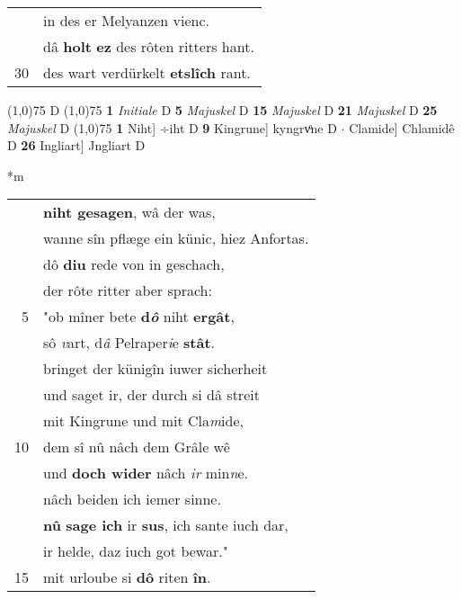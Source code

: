 \documentclass[8pt,a4paper,notitlepage]{article}
\begin{document}
\begin{table}[ht]
\begin{minipage}[t]{0.5\linewidth}
\begin{tabular}{rl}
 & in des er Melyanzen vienc.\\ 
 & dâ \textbf{holt} \textbf{ez} des rôten ritters hant.\\ 
30 & des wart verdürkelt \textbf{etslîch} rant.\\ 
\end{tabular}
\scriptsize
\line(1,0){75} \newline
D \newline
\line(1,0){75} \newline
\textbf{1} \textit{Initiale} D  \textbf{5} \textit{Majuskel} D  \textbf{15} \textit{Majuskel} D  \textbf{21} \textit{Majuskel} D  \textbf{25} \textit{Majuskel} D  \newline
\line(1,0){75} \newline
\textbf{1} Niht] ÷iht D \textbf{9} Kingrune] kyngrvͦne D  $\cdot$ Clamide] Chlamidê D \textbf{26} Ingliart] Jngliart D \newline
\end{minipage}
\hspace{0.5cm}
\begin{minipage}[t]{0.5\linewidth}
\small
\begin{center}*m
\end{center}
\begin{tabular}{rl}
 & \textbf{niht gesagen}, wâ der was,\\ 
 & wanne sîn pflæge ein künic, hiez Anfortas.\\ 
 & dô \textbf{diu} rede von in geschach,\\ 
 & der rôte ritter aber sprach:\\ 
5 & "ob mîner bete \textbf{d\textit{ô}} niht \textbf{ergât},\\ 
 & sô \textit{v}art, d\textit{â} Pelraper\textit{i}e \textbf{stât}.\\ 
 & bringet der künigîn iuwer sicherheit\\ 
 & und saget ir, der durch si dâ streit\\ 
 & mit Kingrune und mit Cla\textit{m}ide,\\ 
10 & dem sî nû nâch dem Grâle wê\\ 
 & und \textbf{doch wider} nâch \textit{ir} min\textit{n}e.\\ 
 & nâch beiden ich iemer sinne.\\ 
 & \textbf{nû} \textbf{sage ich} ir \textbf{sus}, ich sante iuch dar,\\ 
 & ir helde, daz iuch got bewar."\\ 
15 & mit urloube si \textbf{dô} riten \textbf{în}.\\ 

\end{tabular}
\end{minipage}
\end{table}
\end{document}
